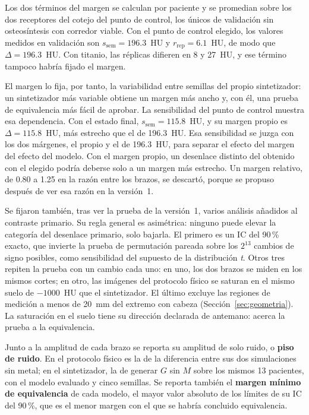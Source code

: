 Los dos términos del margen se calculan por paciente y se promedian sobre los dos receptores del cotejo del punto de control, los únicos de validación sin osteosíntesis con corredor viable. Con el punto de control elegido, los valores medidos en validación son $s_{\mathrm{sem}} = 196.3$~HU y $r_{\mathrm{rep}} = 6.1$~HU, de modo que $\Delta = 196.3$~HU. Con titanio, las réplicas difieren en 8 y 27~HU, y ese término tampoco habría fijado el margen.

El margen lo fija, por tanto, la variabilidad entre semillas del propio sintetizador: un sintetizador más variable obtiene un margen más ancho y, con él, una prueba de equivalencia más fácil de aprobar. La sensibilidad del punto de control muestra esa dependencia. Con el estado final, $s_{\mathrm{sem}} = 115.8$~HU, y su margen propio es $\Delta = 115.8$~HU, más estrecho que el de 196.3~HU. Esa sensibilidad se juzga con los dos márgenes, el propio y el de 196.3~HU, para separar el efecto del margen del efecto del modelo. Con el margen propio, un desenlace distinto del obtenido con el elegido podría deberse solo a un margen más estrecho. Un margen relativo, de 0.80 a 1.25 en la razón entre los brazos, se descartó, porque se propuso después de ver esa razón en la versión~1.

Se fijaron también, tras ver la prueba de la versión~1, varios análisis añadidos al contraste primario. Su regla general es asimétrica: ninguno puede elevar la categoría del desenlace primario, solo bajarla. El primero es un IC del 90\,\% exacto, que invierte la prueba de permutación pareada sobre los $2^{13}$ cambios de signo posibles, como sensibilidad del supuesto de la distribución \emph{t}. Otros tres repiten la prueba con un cambio cada uno: en uno, los dos brazos se miden en los mismos cortes; en otro, las imágenes del protocolo físico se saturan en el mismo suelo de $-1000$~HU que el sintetizador. El último excluye las regiones de medición a menos de 20~mm del extremo con cabeza (Sección~\ref{sec:geometria}). La saturación en el suelo tiene su dirección declarada de antemano: acerca la prueba a la equivalencia.

Junto a la amplitud de cada brazo se reporta su amplitud de solo ruido, o \textbf{piso de ruido}. En el protocolo físico es la de la diferencia entre sus dos simulaciones sin metal; en el sintetizador, la de generar $G$ sin $M$ sobre los mismos 13 pacientes, con el modelo evaluado y cinco semillas. Se reporta también el \textbf{margen mínimo de equivalencia} de cada modelo, el mayor valor absoluto de los límites de su IC del 90\,\%, que es el menor margen con el que se habría concluido equivalencia.

